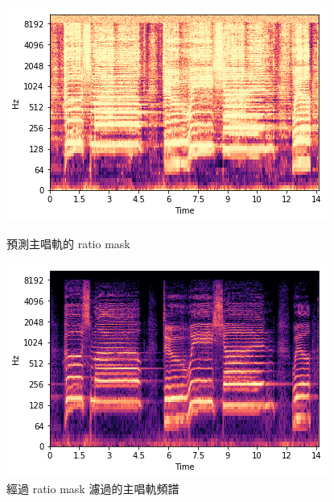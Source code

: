 \begin{figure}[htbp]
    \hfil
    \begin{minipage}[t]{0.45\textwidth}
        \centering
        \includegraphics[width=\textwidth]{./figures/chapter02_method/oracle_filtering1.png}
        \caption {預測主唱軌的 ratio mask}
        \label{oracle_filtering1}
    \end{minipage}
    \begin{minipage}[t]{0.45\textwidth}
        \centering
        \includegraphics[width=\textwidth]{./figures/chapter02_method/oracle_filtering2.png}
        \caption {經過 ratio mask 濾過的主唱軌頻譜}
        \label{oracle_filtering2}
    \end{minipage}
    \hfil
\end{figure}

